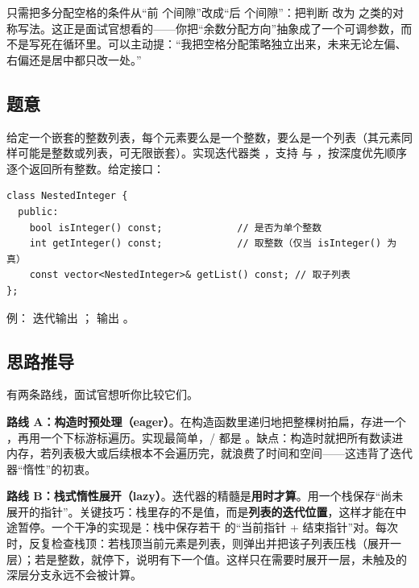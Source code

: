 \begin{followup}[“如果要求右侧间隙分得更多呢？”]
只需把多分配空格的条件从“前  个间隙”改成“后  个间隙”：把判断  改为  之类的对称写法。这正是面试官想看的——你把“余数分配方向”抽象成了一个可调参数，而不是写死在循环里。可以主动提：“我把空格分配策略独立出来，未来无论左偏、右偏还是居中都只改一处。”
\end{followup}


\subsection*{题意}
给定一个嵌套的整数列表，每个元素要么是一个整数，要么是一个列表（其元素同样可能是整数或列表，可无限嵌套）。实现迭代器类 ，支持  与 ，按深度优先顺序逐个返回所有整数。给定接口：
\begin{lstlisting}
class NestedInteger {
  public:
    bool isInteger() const;             // 是否为单个整数
    int getInteger() const;             // 取整数（仅当 isInteger() 为真）
    const vector<NestedInteger>& getList() const; // 取子列表
};
\end{lstlisting}
例：\code{[[1,1],2,[1,1]]} 迭代输出 ； 输出 。

\subsection*{思路推导}
有两条路线，面试官想听你比较它们。

\textbf{路线 A：构造时预处理（eager）}。在构造函数里递归地把整棵树拍扁，存进一个 ，再用一个下标游标遍历。实现最简单，/ 都是 。缺点：构造时就把所有数读进内存，若列表极大或后续根本不会遍历完，就浪费了时间和空间——这违背了迭代器“惰性”的初衷。

\textbf{路线 B：栈式惰性展开（lazy）}。迭代器的精髓是\textbf{用时才算}。用一个栈保存“尚未展开的指针”。关键技巧：栈里存的不是值，而是\textbf{列表的迭代位置}，这样才能在中途暂停。一个干净的实现是：栈中保存若干  的“当前指针 + 结束指针”对。每次  时，反复检查栈顶：若栈顶当前元素是列表，则弹出并把该子列表压栈（展开一层）；若是整数，就停下，说明有下一个值。这样只在需要时展开一层，未触及的深层分支永远不会被计算。

